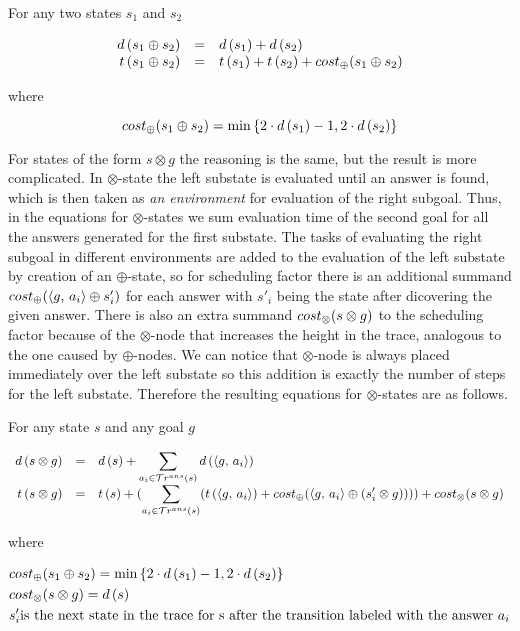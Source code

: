 \begin{lemma}
\label{lem:sum_estimation}
For any two states $s_1$ and $s_2$

\[
\begin{array}{rcl}
  d\,(s_1 \oplus s_2) &=& d\,(s_1) + d\,(s_2) \\

    t\,(s_1 \oplus s_2) &=& t\,(s_1) + t\,(s_2) + cost_{\oplus}(s_1 \oplus s_2)
\end{array}
\]

where

\[ cost_{\oplus}(s_1 \oplus s_2) = \min\,\{2\cdot d\,(s_1) - 1, 2\cdot d\,(s_2)\} \] 

\end{lemma}

For states of the form $s \otimes g$ the reasoning is the same, but the result is more complicated.
In $\otimes$-state the left substate is evaluated until an answer is found, which is then taken as
\emph{an environment} for evaluation of the right subgoal.
Thus, in the equations for $\otimes$-states we sum evaluation time of the second goal for all
the answers generated for the first substate.
The tasks of evaluating the right subgoal in different environments are added to the
evaluation of the left substate by creation of an $\oplus$-state, so for scheduling factor there is
an additional summand $cost_{\oplus}(\langle g ,\, a_i \rangle \oplus s'_i)$ for each answer with $s'_i$ being the state
after dicovering the given answer.
There is also an extra summand $cost_{\otimes}(s \otimes g)$ to the scheduling factor because of the
$\otimes$-node that increases the height in the trace, analogous to the one caused by
$\oplus$-nodes.
We can notice that $\otimes$-node is always placed immediately over the left substate so this
addition is exactly the number of steps for the left substate.
Therefore the resulting equations for $\otimes$-states are as follows.

\begin{lemma}
For any state $s$ and any goal $g$

\[
\begin{array}{rcl}
d\,(s \otimes g)  &=&  d\,(s) + \displaystyle\sum\limits_{a_i \in \mathcal{T}r^{ans}(s)} d\,(\langle g ,\, a_i \rangle) \\

 t\,(s \otimes g)  &=&  t\,(s) + (\displaystyle\sum\limits_{a_i \in \mathcal{T}r^{ans}(s)} (t\,(\langle g ,\, a_i \rangle) + cost_{\oplus}(\langle g ,\, a_i \rangle \oplus (s'_i \otimes g)))) + cost_{\otimes}(s \otimes g)
\end{array}
\]

where 

\begin{align*}
& cost_{\oplus}(s_1 \oplus s_2) = \min\,\{2\cdot d\,(s_1) - 1, 2\cdot d\,(s_2)\} \\
& cost_{\otimes}(s \otimes g) = d\,(s) \\
& s'_i \text{is the next state in the trace for s after the transition labeled with the answer $a_i$} \\
\end{align*}
\end{lemma}


